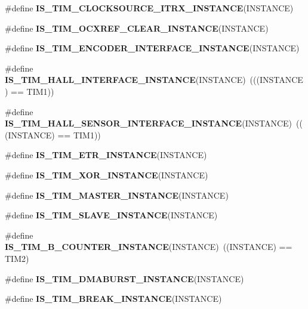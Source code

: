 \begin{DoxyCompactItemize}
\item 
\#define {\bfseries I\+S\+\_\+\+T\+I\+M\+\_\+\+C\+L\+O\+C\+K\+S\+O\+U\+R\+C\+E\+\_\+\+I\+T\+R\+X\+\_\+\+I\+N\+S\+T\+A\+N\+CE}(I\+N\+S\+T\+A\+N\+CE)
\item 
\#define {\bfseries I\+S\+\_\+\+T\+I\+M\+\_\+\+O\+C\+X\+R\+E\+F\+\_\+\+C\+L\+E\+A\+R\+\_\+\+I\+N\+S\+T\+A\+N\+CE}(I\+N\+S\+T\+A\+N\+CE)
\item 
\#define {\bfseries I\+S\+\_\+\+T\+I\+M\+\_\+\+E\+N\+C\+O\+D\+E\+R\+\_\+\+I\+N\+T\+E\+R\+F\+A\+C\+E\+\_\+\+I\+N\+S\+T\+A\+N\+CE}(I\+N\+S\+T\+A\+N\+CE)
\item 
\mbox{\label{group___exported__macro_gacdcc047699e2d83c9d2b3a3f8375dff4}} 
\#define {\bfseries I\+S\+\_\+\+T\+I\+M\+\_\+\+H\+A\+L\+L\+\_\+\+I\+N\+T\+E\+R\+F\+A\+C\+E\+\_\+\+I\+N\+S\+T\+A\+N\+CE}(I\+N\+S\+T\+A\+N\+CE)~(((I\+N\+S\+T\+A\+N\+CE) == T\+I\+M1))
\item 
\mbox{\label{group___exported__macro_ga979ea18ba0931f5ed15cc2f3ac84794b}} 
\#define {\bfseries I\+S\+\_\+\+T\+I\+M\+\_\+\+H\+A\+L\+L\+\_\+\+S\+E\+N\+S\+O\+R\+\_\+\+I\+N\+T\+E\+R\+F\+A\+C\+E\+\_\+\+I\+N\+S\+T\+A\+N\+CE}(I\+N\+S\+T\+A\+N\+CE)~(((I\+N\+S\+T\+A\+N\+CE) == T\+I\+M1))
\item 
\#define {\bfseries I\+S\+\_\+\+T\+I\+M\+\_\+\+E\+T\+R\+\_\+\+I\+N\+S\+T\+A\+N\+CE}(I\+N\+S\+T\+A\+N\+CE)
\item 
\#define {\bfseries I\+S\+\_\+\+T\+I\+M\+\_\+\+X\+O\+R\+\_\+\+I\+N\+S\+T\+A\+N\+CE}(I\+N\+S\+T\+A\+N\+CE)
\item 
\#define {\bfseries I\+S\+\_\+\+T\+I\+M\+\_\+\+M\+A\+S\+T\+E\+R\+\_\+\+I\+N\+S\+T\+A\+N\+CE}(I\+N\+S\+T\+A\+N\+CE)
\item 
\#define {\bfseries I\+S\+\_\+\+T\+I\+M\+\_\+\+S\+L\+A\+V\+E\+\_\+\+I\+N\+S\+T\+A\+N\+CE}(I\+N\+S\+T\+A\+N\+CE)
\item 
\mbox{\label{group___exported__macro_gac41867bf288927ff8ff10a85e67a591b}} 
\#define {\bfseries I\+S\+\_\+\+T\+I\+M\+\_\+B\+\_\+\+C\+O\+U\+N\+T\+E\+R\+\_\+\+I\+N\+S\+T\+A\+N\+CE}(I\+N\+S\+T\+A\+N\+CE)~((I\+N\+S\+T\+A\+N\+CE) == T\+I\+M2)
\item 
\#define {\bfseries I\+S\+\_\+\+T\+I\+M\+\_\+\+D\+M\+A\+B\+U\+R\+S\+T\+\_\+\+I\+N\+S\+T\+A\+N\+CE}(I\+N\+S\+T\+A\+N\+CE)
\item 
\#define {\bfseries I\+S\+\_\+\+T\+I\+M\+\_\+\+B\+R\+E\+A\+K\+\_\+\+I\+N\+S\+T\+A\+N\+CE}(I\+N\+S\+T\+A\+N\+CE)

\end{DoxyCompactItemize}
